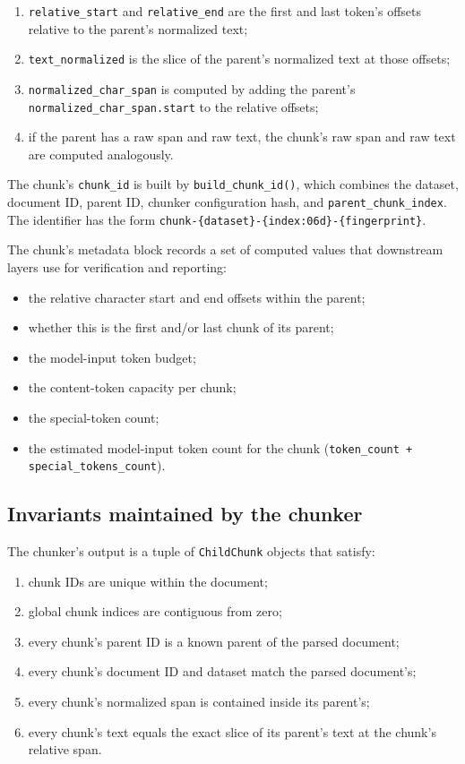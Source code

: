 \documentclass[11pt,a4paper]{article}
\begin{document}
\begin{enumerate}[leftmargin=1.5em,itemsep=0.15em]
  \item \texttt{relative\_start} and \texttt{relative\_end} are the
    first and last token's offsets relative to the parent's
    normalized text;
  \item \texttt{text\_normalized} is the slice of the parent's
    normalized text at those offsets;
  \item \texttt{normalized\_char\_span} is computed by adding the
    parent's \texttt{normalized\_char\_span.start} to the relative
    offsets;
  \item if the parent has a raw span and raw text, the chunk's raw
    span and raw text are computed analogously.
\end{enumerate}

The chunk's \texttt{chunk\_id} is built by
\texttt{build\_chunk\_id()}, which combines the dataset, document ID,
parent ID, chunker configuration hash, and \texttt{parent\_chunk\_index}.
The identifier has the form
\texttt{chunk-\{dataset\}-\{index:06d\}-\{fingerprint\}}.

The chunk's metadata block records a set of computed values that
downstream layers use for verification and reporting:
\begin{itemize}[leftmargin=1.5em,itemsep=0.15em]
  \item the relative character start and end offsets within the
    parent;
  \item whether this is the first and/or last chunk of its parent;
  \item the model-input token budget;
  \item the content-token capacity per chunk;
  \item the special-token count;
  \item the estimated model-input token count for the chunk
    (\texttt{token\_count + special\_tokens\_count}).
\end{itemize}

\subsection{Invariants maintained by the chunker}
The chunker's output is a tuple of \texttt{ChildChunk} objects that
satisfy:

\begin{enumerate}[leftmargin=1.5em,itemsep=0.15em]
  \item chunk IDs are unique within the document;
  \item global chunk indices are contiguous from zero;
  \item every chunk's parent ID is a known parent of the parsed
    document;
  \item every chunk's document ID and dataset match the parsed
    document's;
  \item every chunk's normalized span is contained inside its
    parent's;
  \item every chunk's text equals the exact slice of its parent's
    text at the chunk's relative span.
\end{enumerate}
\end{document}
